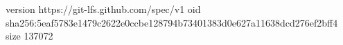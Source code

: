 version https://git-lfs.github.com/spec/v1
oid sha256:5eaf5783e1479c2622e0ccbe128794b73401383d0e627a11638dcd276ef2bff4
size 137072
